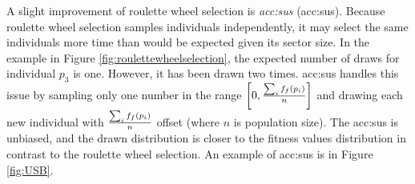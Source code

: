 A slight improvement of roulette wheel selection is \emph{\acrlong*{acc:sus}} (\acrshort{acc:sus}). Because roulette wheel selection samples individuals independently, it may select the same individuals more time than would be expected given its sector size. In the example in Figure \ref{fig:roulettewheelselection}, the expected number of draws for individual $p_3$ is one. However, it has been drawn two times. \acrlong{acc:sus} handles this issue by sampling only one number in the range $\left[0,\frac{\sum_if_f(p_i)}{n} \right]$ and drawing each new individual with $\frac{\sum_if_f(p_i)}{n}$ offset (where $n$ is population size). The \acrshort{acc:sus} is unbiased, and the drawn distribution is closer to the fitness values distribution in contrast to the roulette wheel selection. An example of \acrshort{acc:sus} is in Figure \ref{fig:USB}.

